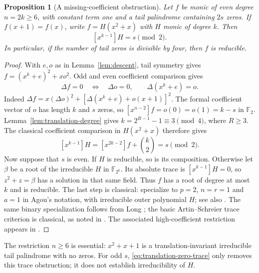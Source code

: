 \documentclass[11pt]{article}
\newtheorem{proposition}{Proposition}[section]
\theoremstyle{definition}
\theoremstyle{remark}
\begin{document}
\begin{proposition}[A missing-coefficient obstruction]
\label{prop:translation-zero-obstruction}
Let $f$ be monic of even degree $n=2k\ge6$, with constant term one
and a tail palindrome containing $2s$ zeros. If $f(x+1)=f(x)$,
write $f=H(x^2+x)$ with $H$ monic of degree $k$. Then
\begin{equation}\label{eq:translation-zero-trace}
 [x^{k-1}]H=s\pmod2.
\end{equation}
In particular, if the number of tail zeros is divisible by four,
then $f$ is reducible.
\end{proposition}
\begin{proof}
With $e,o$ as in Lemma~\ref{lem:descent}, tail symmetry gives
$f=(x^k+e)^2+xo^2$. Odd and even coefficient comparison gives
\begin{equation}\label{eq:translation-descent}
 \Delta f=0\quad\Longleftrightarrow\quad
 \Delta o=0,\qquad \Delta(x^k+e)=o.
\end{equation}
Indeed $\Delta f=x(\Delta o)^2+
[\Delta(x^k+e)+o(x+1)]^2$.
The formal coefficient vector of $o$ has length $k$ and $s$ zeros,
so $[x^{n-2}]f=o(0)=o(1)=k-s$ in $\mathbb F_2$.
Lemma~\ref{lem:translation-degree} gives
$k=2^{R-1}-1\equiv3\pmod4$, where $R\ge3$.
The classical coefficient comparison in $H(x^2+x)$ therefore gives
\[
 [x^{k-1}]H=[x^{2k-2}]f+\binom{k}{2}=s\pmod2.
\]
Now suppose that $s$ is even. If $H$ is reducible, so is its composition.
Otherwise let $\beta$ be a root of the irreducible $H$ in
$\mathbb F_{2^k}$. Its absolute trace is $[x^{k-1}]H=0$,
so $z^2+z=\beta$ has a solution in that same field.
Thus $f$ has a root of degree at most $k$ and is reducible.
The last step is classical: specialize \cite[Theorem~2.2(2)]{Ago77}
to $p=2$, $n=r=1$ and $a=1$ in Agou's notation, with irreducible
outer polynomial $H$; see also \cite[Theorem~2.2]{Kap17}.
The same binary specialization follows from Long
\cite[Theorems~4.1--4.2, pp.~69 and 71]{Long73}; the basic
Artin--Schreier trace criterion is classical, as noted in
\cite[p.~63]{Long73}. The associated high-coefficient restriction appears in
\cite[Theorem~2.8(3)]{Kap17}.
\end{proof}

The restriction $n\ge6$ is essential: $x^2+x+1$ is a
translation-invariant irreducible tail palindrome with no zeros.
For odd $s$, \eqref{eq:translation-zero-trace} only removes this
trace obstruction; it does not establish irreducibility of $H$.
\end{document}
